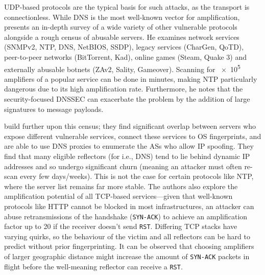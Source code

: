 UDP-based protocols are the typical basis for such attacks, as the transport is connectionless.
While DNS is the most well-known vector for amplification, \textcite{DBLP:conf/ndss/Rossow14} presents an in-depth survey of a wide variety of other vulnerable protocols alongside a rough census of abusable servers.
He examines network services (SNMPv2, NTP, DNS, NetBIOS, SSDP), legacy services (CharGen, QoTD), peer-to-peer networks (BitTorrent, Kad), online games (Steam, Quake 3) and externally abusable botnets (ZAv2, Sality, Gameover).
Scanning for \num{e5} amplifiers of a popular service can be done in minutes, making NTP particularly dangerous due to its high amplification rate.
Furthermore, he notes that the security-focused DNSSEC can exacerbate the problem by the addition of large signatures to message payloads.

\textcite{DBLP:conf/uss/KuhrerHRH14} build further upon this census; they find significant overlap between servers who expose different vulnerable services, connect these services to OS fingerprints, and are able to use DNS proxies to enumerate the ASs who allow IP spoofing.
They find that many eligible reflectors (for i.e., DNS) tend to lie behind dynamic IP addresses and so undergo significant churn (meaning an attacker must often re-scan every few days/weeks).
This is not the case for certain protocols like NTP, where the server list remains far more stable.
The authors also explore the amplification potential of all TCP-based services---given that well-known protocols like HTTP cannot be blocked in most infrastructures, an attacker can abuse retransmissions of the handshake (\texttt{SYN-ACK}) to achieve an amplification factor up to \num{20} if the receiver doesn't send \texttt{RST}.
Differing TCP stacks have varying quirks, so the behaviour of the victim and all reflectors can be hard to predict without prior fingerprinting.
It can be observed that choosing amplifiers of larger geographic distance might increase the amount of \texttt{SYN-ACK} packets in flight before the well-meaning reflector can receive a \texttt{RST}.

